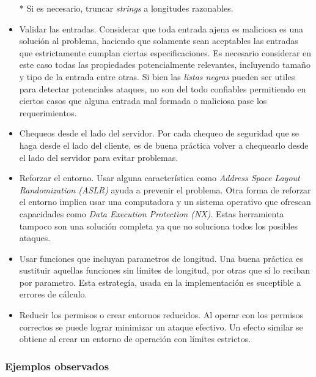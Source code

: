 \begin{itemize}
	* Si es necesario, truncar \textit{strings} a longitudes razonables.
    \item Validar las entradas.
	Considerar que toda entrada ajena es maliciosa es una solución al problema, haciendo que solamente sean aceptables las entradas que estrictamente cumplan ciertas especificaciones.
	Es necesario considerar en este caso todas las propiedades potencialmente relevantes, incluyendo tamaño y tipo de la entrada entre otras.
	Si bien las \textit{listas negras} pueden ser utiles para detectar potenciales ataques, no son del todo confiables permitiendo en ciertos casos que alguna entrada mal formada o maliciosa
	pase los requerimientos.
    \item Chequeos desde el lado del servidor. Por cada chequeo de seguridad que se haga desde el lado del cliente, es de buena práctica volver a chequearlo desde el lado del servidor para
	evitar problemas.
    \item Reforzar el entorno. Usar alguna característica como \textit{Address Space Layout Randomization (ASLR)} ayuda a prevenir el problema.
	Otra forma de reforzar el entorno implica usar una computadora y un sistema operativo que ofrescan capacidades como \textit{Data Execution Protection (NX)}.
	Estas herramienta tampoco son una solución completa ya que no soluciona todos los posibles ataques.
    \item Usar funciones que incluyan parametros de longitud. Una buena práctica es sustituir aquellas funciones sin límites de longitud, por otras que sí lo reciban por parametro.
	Esta estrategía, usada en la implementación es suceptible a errores de cálculo.
    \item Reducir los permisos o crear entornos reducidos. Al operar con los permisos correctos se puede lograr minimizar un ataque efectivo. Un efecto similar se obtiene al crear un
	entorno de operación con límites estrictos.
\end{itemize}

\subsubsection{Ejemplos observados}

